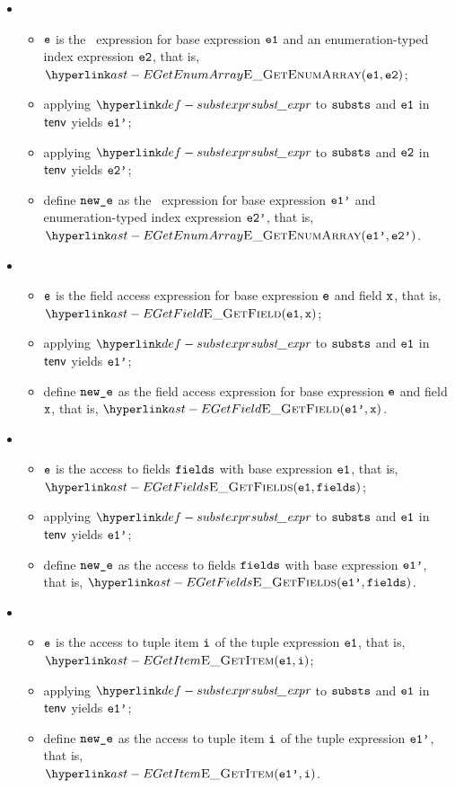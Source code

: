 \begin{itemize}
  \item {}
  \begin{itemize}
    \item $\texttt{e}$ is the \arrayaccess\ expression for base expression $\texttt{e1}$ and an enumeration-typed index expression $\texttt{e2}$,
          that is, $\EGetEnumArray(\veone, \vetwo)$;
    \item applying $\substexpr$ to $\texttt{substs}$ and $\texttt{e1}$ in $\textsf{tenv}$ yields $\texttt{e1'}$;
    \item applying $\substexpr$ to $\texttt{substs}$ and $\texttt{e2}$ in $\textsf{tenv}$ yields $\texttt{e2'}$;
    \item define $\texttt{new\_e}$ as the \arrayaccess\ expression for base expression $\texttt{e1'}$ and \\
          enumeration-typed index expression $\texttt{e2'}$,
          that is, $\EGetEnumArray(\veonep, \vetwop)$.
  \end{itemize}

  \item {}
  \begin{itemize}
    \item $\texttt{e}$ is the field access expression for base expression $\texttt{e}$ and field $\texttt{x}$,
          that is, $\EGetField(\veone, \vx)$;
    \item applying $\substexpr$ to $\texttt{substs}$ and $\texttt{e1}$ in $\textsf{tenv}$ yields $\texttt{e1'}$;
    \item define $\texttt{new\_e}$ as the field access expression for base expression $\texttt{e}$ and field $\texttt{x}$,
          that is, $\EGetField(\veonep, \vx)$.
  \end{itemize}

  \item {}
  \begin{itemize}
    \item $\texttt{e}$ is the access to fields $\texttt{fields}$ with base expression $\texttt{e1}$, that is, \\
          $\EGetFields(\veone, \fields)$;
    \item applying $\substexpr$ to $\texttt{substs}$ and $\texttt{e1}$ in $\textsf{tenv}$ yields $\texttt{e1'}$;
    \item define $\texttt{new\_e}$ as the access to fields $\texttt{fields}$ with base expression $\texttt{e1'}$, that is, $\EGetFields(\veonep, \fields)$.
  \end{itemize}

  \item {}
  \begin{itemize}
    \item $\texttt{e}$ is the access to tuple item $\texttt{i}$ of the tuple expression $\texttt{e1}$, that is, \\
          $\EGetItem(\veone, \vi)$;
    \item applying $\substexpr$ to $\texttt{substs}$ and $\texttt{e1}$ in $\textsf{tenv}$ yields $\texttt{e1'}$;
    \item define $\texttt{new\_e}$ as the access to tuple item $\texttt{i}$ of the tuple expression $\texttt{e1'}$, that is, \\
          $\EGetItem(\veonep, \vi)$.
  \end{itemize}


\end{itemize}
